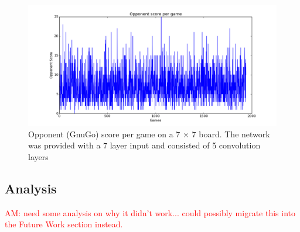\begin{figure}[h!]
\centering
\includegraphics[scale=0.5]{training_score.png}
\caption{Opponent (GnuGo) score per game on a 7 $\times$ 7 board. The network was provided with a 7 layer input and consisted of 5 convolution layers}
\label{fig:score}
\end{figure}

\subsection*{Analysis}

\textcolor{red}{AM: need some analysis on why it didn't work... could possibly migrate this into the Future Work section instead.}